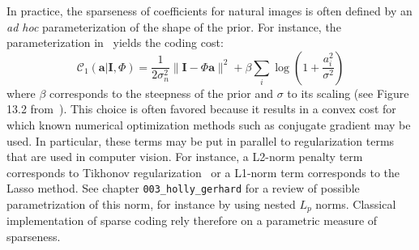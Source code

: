 \documentclass[a4paper, 11pt]{book}
\newcommand{\image}{\mathbf{I}} %
\newcommand{\dico}{\Phi} %
\newcommand{\coef}{\mathbf{a}} %
\begin{document}
In practice, the sparseness of coefficients for natural images is often defined by an \emph{ad hoc} parameterization of the shape of the prior. For instance, the parameterization in~\citet{Olshausen97} yields the coding cost:%
\begin{equation}
\mathcal{C}_1( \coef | \image , \dico) =\frac{1}{2\sigma_n^2} \| \image - \dico \coef \|^2 + \beta \sum_i \log ( 1 + \frac{a_i^2}{\sigma^2} )%
\label{eq:sparse_cost}%
\end{equation}
where $\beta$ corresponds to the steepness of the prior and $\sigma$ to its scaling (see Figure 13.2 from~\citep{Olshausen02}). This choice is often favored because it results in a convex cost for which known numerical optimization methods such as conjugate gradient may be used. In particular, these terms may be put in parallel to regularization terms that are used in computer vision. For instance, a L2-norm penalty term corresponds to Tikhonov regularization~\citep{Tikhonov77} or a L1-norm term corresponds to the Lasso method. 
See chapter \verb+003_holly_gerhard+ for a review of possible parametrization of this norm, 
for instance by using nested $L_p$ norms.
Classical implementation of sparse coding rely therefore on a parametric measure of sparseness.
\end{document}
